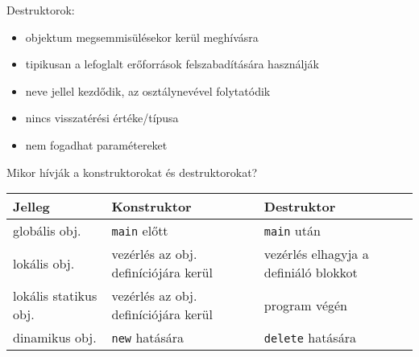 \documentclass[usenames,dvipsnames,aspectratio=169]{beamer}
\begin{document}
\begin{frame}
    \begin{exampleblock}{}
        
    \end{exampleblock}
\end{frame}

\begin{frame}
    \begin{exampleblock}{}
        
    \end{exampleblock}
\end{frame}

\begin{frame}
    Destruktorok:
    \begin{itemize}
        \item objektum megsemmisülésekor kerül meghívásra
        \item tipikusan a lefoglalt erőforrások felszabadítására használják
        \item neve \kiemel{~} jellel kezdődik, az osztálynevével folytatódik
        \item nincs visszatérési értéke/típusa
        \item nem fogadhat paramétereket
    \end{itemize}
\end{frame}

\begin{frame}
    Mikor hívják a konstruktorokat és destruktorokat?
    \begin{center}
        \begin{tabular}{ p{3cm}|p{4.5cm}|p{4.5cm} } 
        Jelleg & Konstruktor & Destruktor \\
        \hline
        globális obj. & \texttt{main} előtt & \texttt{main} után \\
        lokális obj. & vezérlés az obj. definíciójára kerül & vezérlés elhagyja a definiáló blokkot \\
        lokális statikus obj. & vezérlés az obj. definíciójára kerül & program végén \\
        dinamikus obj. & \texttt{new} hatására & \texttt{delete} hatására
        \end{tabular}
    \end{center}
\end{frame}
\end{document}
